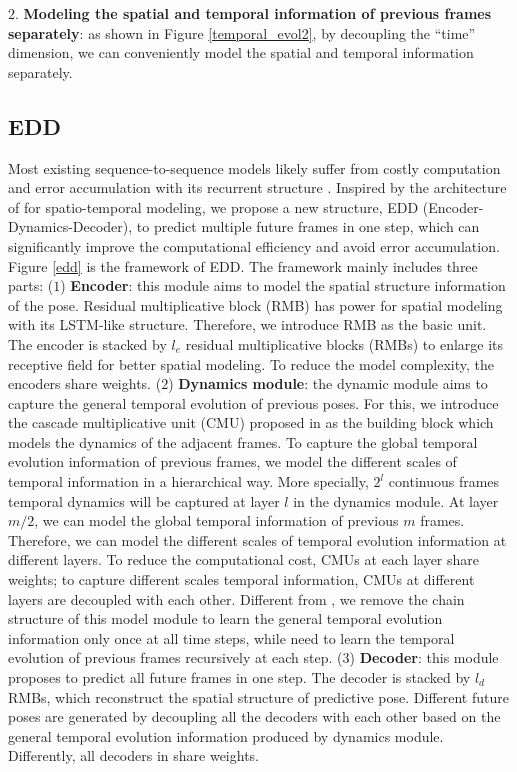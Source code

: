 \documentclass[journal]{IEEEtran}
\begin{document}
${2}$.	{\bf Modeling the spatial and temporal information of previous frames separately}: as shown in Figure \ref{temporal_evol2}, by decoupling the ``time'' dimension, we can conveniently model the spatial and temporal information separately.


\subsection{EDD}
Most existing sequence-to-sequence models likely suffer from costly computation and error accumulation with its recurrent structure \cite{predcnn,MartinezOMP,Guifewshot,fstvp}. Inspired by the architecture of \cite{predcnn} for spatio-temporal modeling, we propose a new structure, EDD (Encoder-Dynamics-Decoder), to predict multiple future frames in one step, which can significantly improve the computational efficiency and avoid error accumulation. Figure \ref{edd} is the framework of EDD. The framework mainly includes three parts: (${1}$) {\bf Encoder}: this module aims to model the spatial structure information of the pose. Residual multiplicative block (RMB) \cite{vpn} has power for spatial modeling with its LSTM-like structure. Therefore, we introduce RMB as the basic unit. The encoder is stacked by ${l_e}$ residual multiplicative blocks (RMBs) to enlarge its receptive field for better spatial modeling. To reduce the model complexity, the encoders share weights. (${2}$) {\bf Dynamics module}: the dynamic module aims to capture the general temporal evolution of previous poses. For this, we introduce the cascade multiplicative unit (CMU) proposed in \cite{predcnn} as the building block which models the dynamics of the adjacent frames. To capture the global temporal evolution information of previous frames, we model the different scales of temporal information in a hierarchical way. More specially, ${2^l}$ continuous frames temporal dynamics will be captured at layer ${l}$ in the dynamics module. At layer ${m}/2$, we can model the global temporal information of previous ${m}$ frames. Therefore, we can model the different scales of temporal evolution information at different layers. To reduce the computational cost, CMUs at each layer share weights; to capture different scales temporal information, CMUs at different layers are decoupled with each other. Different from \cite{predcnn}, we remove the chain structure of this model module to learn the general temporal evolution information only once at all time steps, while \cite{predcnn} need to learn the temporal evolution of previous frames recursively at each step. (${3}$) {\bf Decoder}: this module proposes to predict all future frames in one step. The decoder is stacked by ${l_d}$ RMBs, which reconstruct the spatial structure of predictive pose. Different future poses are generated by decoupling all the decoders with each other based on the general temporal evolution information produced by dynamics module. Differently, all decoders in \cite{predcnn} share weights.
\end{document}
